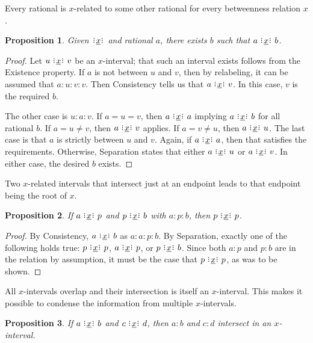 \documentclass[12pt]{article}
\newtheorem{proposition}{Proposition}[section]
\begin{document}
Every rational is $x$-related to some other rational for every betweenness relation $x$. 

\begin{proposition}\label{br:existence}
    Given $\xrel$ and rational $a$, there exists $b$ such that $a \xrel b$. 
\end{proposition}

\begin{proof}
    Let $u \xrel v$ be an $x$-interval; that such an interval exists follows from the Existence property. If $a$ is not between $u$ and $v$, then by relabeling, it can be assumed that $a:u:v:v$. Then Consistency tells us that $a \xrel v$. In this case, $v$ is the required $b$. 

    The other case is $u:a:v$. If $a = u = v$, then $a \xrel a$ implying $a \xrel b$ for all rational $b$.  If $a = u \neq v$, then $a \xrel v$ applies. If $a  = v \neq u$, then $a \xrel u$. The last case is that $a$ is strictly between $u$ and $v$. Again, if $a \xrel a$, then that satisfies the requirements. Otherwise, Separation states that either $a \xrel u$ or $a \xrel v$. In either case, the desired $b$ exists. 
\end{proof}

Two $x$-related intervals that intersect just at an endpoint leads to that endpoint being the root of $x$. 

\begin{proposition}\label{br:endpointed}
    If $a \xrel p$ and $p \xrel b$ with $a:p:b$, then $p \xrel p$.
\end{proposition}

\begin{proof}
    By Consistency, $a \xrel b$ as $a:a:p:b$.  By Separation, exactly one of the following holds true: $p \xrel p$,  \sout{$a \xrel p$}, or \sout{$p \xrel b$}. Since both $a:p$ and $p:b$ are in the relation by assumption, it must be the case that $p \xrel p$, as was to be shown. 
\end{proof}

All $x$-intervals overlap and their intersection is itself an $x$-interval. This makes it possible to condense the information from multiple $x$-intervals. 

\begin{proposition}\label{br:intersect}
    If $a \xrel b$ and $c \xrel d$, then $a:b$ and $c:d$ intersect in an $x$-interval. 
\end{proposition}
\end{document}
